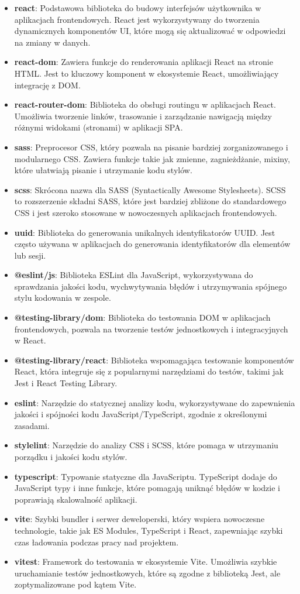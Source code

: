 \documentclass[12pt,a4paper]{article}
\begin{document}
\begin{itemize}
    \item \textbf{react}: Podstawowa biblioteka do budowy interfejsów użytkownika w aplikacjach frontendowych. React jest wykorzystywany do tworzenia dynamicznych komponentów UI, które mogą się aktualizować w odpowiedzi na zmiany w danych.
    \item \textbf{react-dom}: Zawiera funkcje do renderowania aplikacji React na stronie HTML. Jest to kluczowy komponent w ekosystemie React, umożliwiający integrację z DOM.
    \item \textbf{react-router-dom}: Biblioteka do obsługi routingu w aplikacjach React. Umożliwia tworzenie linków, trasowanie i zarządzanie nawigacją między różnymi widokami (stronami) w aplikacji SPA.
    \item \textbf{sass}: Preprocesor CSS, który pozwala na pisanie bardziej zorganizowanego i modularnego CSS. Zawiera funkcje takie jak zmienne, zagnieżdżanie, mixiny, które ułatwiają pisanie i utrzymanie kodu stylów.
    \item \textbf{scss}: Skrócona nazwa dla SASS (Syntactically Awesome Stylesheets). SCSS to rozszerzenie składni SASS, które jest bardziej zbliżone do standardowego CSS i jest szeroko stosowane w nowoczesnych aplikacjach frontendowych.
    \item \textbf{uuid}: Biblioteka do generowania unikalnych identyfikatorów UUID. Jest często używana w aplikacjach do generowania identyfikatorów dla elementów lub sesji.
    \item \textbf{@eslint/js}: Biblioteka ESLint dla JavaScript, wykorzystywana do sprawdzania jakości kodu, wychwytywania błędów i utrzymywania spójnego stylu kodowania w zespole.
    \item \textbf{@testing-library/dom}: Biblioteka do testowania DOM w aplikacjach frontendowych, pozwala na tworzenie testów jednostkowych i integracyjnych w React.
    \item \textbf{@testing-library/react}: Biblioteka wspomagająca testowanie komponentów React, która integruje się z popularnymi narzędziami do testów, takimi jak Jest i React Testing Library.
    \item \textbf{eslint}: Narzędzie do statycznej analizy kodu, wykorzystywane do zapewnienia jakości i spójności kodu JavaScript/TypeScript, zgodnie z określonymi zasadami.
    \item \textbf{stylelint}: Narzędzie do analizy CSS i SCSS, które pomaga w utrzymaniu porządku i jakości kodu stylów.
    \item \textbf{typescript}: Typowanie statyczne dla JavaScriptu. TypeScript dodaje do JavaScript typy i inne funkcje, które pomagają uniknąć błędów w kodzie i poprawiają skalowalność aplikacji.
    \item \textbf{vite}: Szybki bundler i serwer deweloperski, który wspiera nowoczesne technologie, takie jak ES Modules, TypeScript i React, zapewniając szybki czas ładowania podczas pracy nad projektem.
    \item \textbf{vitest}: Framework do testowania w ekosystemie Vite. Umożliwia szybkie uruchamianie testów jednostkowych, które są zgodne z biblioteką Jest, ale zoptymalizowane pod kątem Vite.
\end{itemize}
\end{document}
